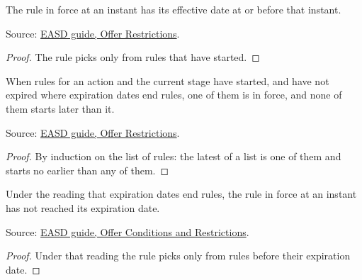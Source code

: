 \begin{theorem}
  \label{thm:offers-rule-started}
  The rule in force at an instant has its effective date at or before that
  instant.

  Source: \href{https://standards.atlassian.net/wiki/spaces/EASD/pages/574259692/Offer+Restrictions}{EASD guide, Offer Restrictions}.
\end{theorem}
\begin{proof}
  The rule picks only from rules that have started.
\end{proof}

\begin{theorem}
  \label{thm:offers-rule-latest}
  When rules for an action and the current stage have started, and have not
  expired where expiration dates end rules, one of them is in force, and
  none of them starts later than it.

  Source: \href{https://standards.atlassian.net/wiki/spaces/EASD/pages/574259692/Offer+Restrictions}{EASD guide, Offer Restrictions}.
\end{theorem}
\begin{proof}
  By induction on the list of rules: the latest of a list is one of them and
  starts no earlier than any of them.
\end{proof}

\begin{theorem}
  \label{thm:offers-rule-not-expired}
  Under the reading that expiration dates end rules, the rule in force at an
  instant has not reached its expiration date.

  Source: \href{https://standards.atlassian.net/wiki/spaces/EASD/pages/574816307/Offer+Conditions+and+Restrictions}{EASD guide, Offer Conditions and Restrictions}.
\end{theorem}
\begin{proof}
  Under that reading the rule picks only from rules before their expiration
  date.
\end{proof}

